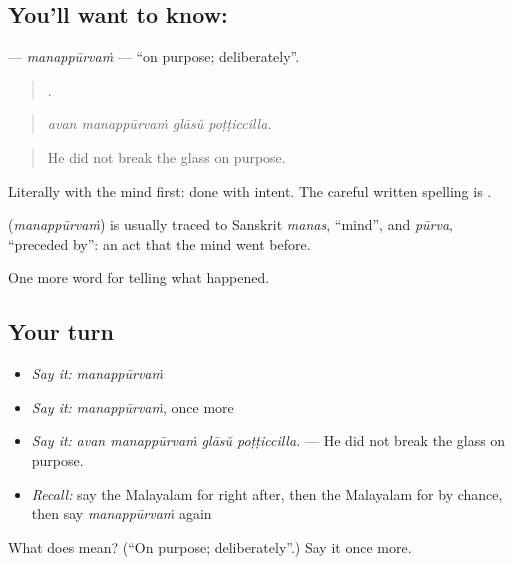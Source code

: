 \subsection*{You'll want to know: }
\textbf{} — \emph{manappūrvaṁ} — \textquotedblleft{}on purpose; deliberately\textquotedblright{}.

\begin{quote}
   .
\end{quote}

\begin{quote}
\emph{avan manappūrvaṁ glāsŭ poṭṭiccilla.}
\end{quote}

\begin{quote}
He did not break the glass on purpose.
\end{quote}

Literally with the mind first: done with intent. The careful written spelling is .

\begin{cousinweb}
\textbf{} (\emph{manappūrvaṁ}) is usually traced to Sanskrit \emph{manas}, \textquotedblleft{}mind\textquotedblright{}, and \emph{pūrva}, \textquotedblleft{}preceded by\textquotedblright{}: an act that the mind went before.
\end{cousinweb}

\begin{grammarlens}[title={What you've built}]
One more word for telling what happened.
\end{grammarlens}

\subsection*{Your turn}
\begin{itemize}
\raggedright
  \item \emph{Say it:} \emph{manappūrvaṁ}
  \item \emph{Say it:} \emph{manappūrvaṁ}, once more
  \item \emph{Say it:} \emph{avan manappūrvaṁ glāsŭ poṭṭiccilla.} — He did not break the glass on purpose.
  \item \emph{Recall:} say the Malayalam for right after, then the Malayalam for by chance, then say \emph{manappūrvaṁ} again
\end{itemize}

\begin{tcolorbox}[breakable,colback=teal!4,colframe=teal!35!black,title={Before you move on}]
What does  mean? (\textquotedblleft{}On purpose; deliberately\textquotedblright{}.) Say it once more.
\end{tcolorbox}
